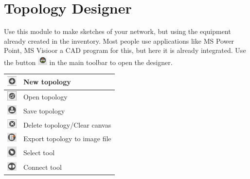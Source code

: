 \documentclass[a4paper]{article}
\begin{document}
	\section{Topology Designer} \label{sec:topology_designer}
		Use this module to make sketches of your network, but using the equipment already created in the inventory. Most people use applications like MS Power Point\texttrademark, MS Visio\texttrademark  or a CAD program for this, but here it is already integrated. Use the button \includegraphics[width=0.5cm]{img/icon_topology_designer.png} in the main toolbar to open the designer.
		\begin{table}[h!]
			\centering
			\begin{tabular}{lp{10cm}}
				\includegraphics[width=0.5cm]{img/icon_new_element.png} & New topology \\
				\midrule
				\includegraphics[width=0.5cm]{img/icon_open.png} & Open topology \\
				\midrule
				\includegraphics[width=0.5cm]{img/icon_save.png} & Save topology \\
				\midrule
				\includegraphics[width=0.5cm]{img/icon_delete.png} & Delete topology/Clear canvas \\
				\midrule
				\includegraphics[width=0.5cm]{img/icon_export.png} & Export topology to image file \\
				\midrule
				\includegraphics[width=0.5cm]{img/icon_select_tool.png} & Select tool \\
				\midrule
				\includegraphics[width=0.5cm]{img/icon_connect_tool.png} & Connect tool \\

\end{tabular}
\end{table}
\end{document}
